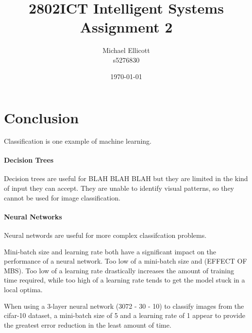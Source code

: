 \documentclass{article}
\title{2802ICT Intelligent Systems Assignment 2}
\author{Michael Ellicott \\ s5276830}
\date{\today}
\begin{document}
\maketitle
\newpage


\tableofcontents
\newpage


\newpage


\newpage



\section*{Conclusion}

Classification is one example of machine learning.

\paragraph{Decision Trees}
Decision trees are useful for BLAH BLAH BLAH but they are limited in the
kind of input they can accept. They are unable to identify visual
patterns, so they cannot be used for image classification.

\paragraph{Neural Networks}
Neural networds are useful for more complex classifcation problems.

Mini-batch size and learning rate both have a significant impact on
the performance of a neural network. Too low of a mini-batch size and
(EFFECT OF MBS). Too low of a learning rate drastically increases the
amount of training time required, while too high of a learning rate
tends to get the model stuck in a local optima.

When using a 3-layer neural network (3072 - 30 - 10) to classify images from
the cifar-10 dataset, a mini-batch size of 5 and a learning rate of 1
appear to provide the greatest error reduction in the least amount of
time.
\end{document}
